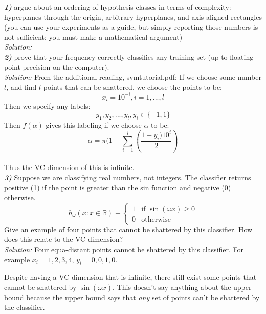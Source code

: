 \documentclass[10pt]{extarticle}
\begin{document}

\textbf{\textit{1)}} argue about an ordering of hypothesis classes in terms of complexity: hyperplanes through the origin, arbitrary hyperplanes, and axis-aligned rectangles (you can use your experiments as a guide, but simply reporting those numbers is not sufficient; you must make a mathematical argument)
\\
\textit{Solution:} 
\\
\textbf{\textit{2)}} prove that your frequency correctly classifies any training set (up to floating point precision on the computer).
\\
\textit{Solution:} From the additional reading, svmtutorial.pdf: If we choose some number $l$, and find $l$ points that can be shattered, we choose the points to be:
$$x_i = 10^{-i}, i = 1, ..., l$$
Then we specify any labels:
$$y_1, y_2, ..., y_l, y_i \in \{-1, 1\}$$
Then $f(\alpha)$ gives this labeling if we choose $\alpha$ to be:
$$\alpha = \pi(1 + \sum_{i=1}^{l}(\frac{1 - y_i)10^i}{2})$$
\\
Thus the VC dimension of this is infinite.
\\
\textbf{\textit{3)}} Suppose we are classifying real numbers, not integers. The classifier returns positive (1) if the point is greater than the sin function and negative (0) otherwise.
$$h_\omega(x : x \in \mathbb{R} ) \equiv \begin{cases} 1& \mbox{if } \sin(\omega x) \geq 0 \\ 0 & \mbox{otherwise} \end{cases}$$
Give an example of four points that cannot be shattered by this classifier. How does this relate to the VC dimension?
\\
\textit{Solution:} Four equa-distant points cannot be shattered by this classifier.  For example $x_i = 1, 2, 3, 4$, $y_i = 0, 0, 1, 0$.


Despite having a VC dimension that is infinite, there still exist some points that cannot be shattered by $\sin(\omega x)$.  This doesn't say anything about the upper bound because the upper bound says that \textit{any} set of points can't be shattered by the classifier.
\end{document}
